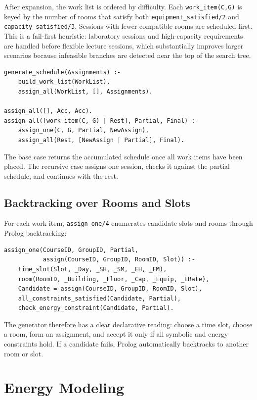 \documentclass[12pt,a4paper]{article}
\newcommand{\predicate}[1]{\texttt{#1}}
\newcommand{\term}[1]{\texttt{#1}}
\begin{document}
After expansion, the work list is ordered by difficulty. Each \term{work\_item(C,G)} is keyed by the number of rooms that satisfy both \predicate{equipment\_satisfied/2} and \predicate{capacity\_satisfied/3}. Sessions with fewer compatible rooms are scheduled first. This is a fail-first heuristic: laboratory sessions and high-capacity requirements are handled before flexible lecture sessions, which substantially improves larger scenarios because infeasible branches are detected near the top of the search tree.

\begin{lstlisting}[caption={Recursive assignment structure}]
generate_schedule(Assignments) :-
    build_work_list(WorkList),
    assign_all(WorkList, [], Assignments).

assign_all([], Acc, Acc).
assign_all([work_item(C, G) | Rest], Partial, Final) :-
    assign_one(C, G, Partial, NewAssign),
    assign_all(Rest, [NewAssign | Partial], Final).
\end{lstlisting}

The base case returns the accumulated schedule once all work items have been placed. The recursive case assigns one session, checks it against the partial schedule, and continues with the rest.

\subsection{Backtracking over Rooms and Slots}

For each work item, \predicate{assign\_one/4} enumerates candidate slots and rooms through Prolog backtracking:

\begin{lstlisting}[caption={Candidate generation and immediate validation}]
assign_one(CourseID, GroupID, Partial,
           assign(CourseID, GroupID, RoomID, Slot)) :-
    time_slot(Slot, _Day, _SH, _SM, _EH, _EM),
    room(RoomID, _Building, _Floor, _Cap, _Equip, _ERate),
    Candidate = assign(CourseID, GroupID, RoomID, Slot),
    all_constraints_satisfied(Candidate, Partial),
    check_energy_constraint(Candidate, Partial).
\end{lstlisting}

The generator therefore has a clear declarative reading: choose a time slot, choose a room, form an assignment, and accept it only if all symbolic and energy constraints hold. If a candidate fails, Prolog automatically backtracks to another room or slot.

\section{Energy Modeling}
\end{document}

